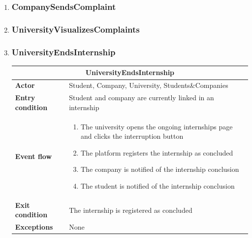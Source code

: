\begin{enumerate}[label=\textbf{UC\arabic* -}]
\item \subsubsection{CompanySendsComplaint}

\item \subsubsection{UniversityVisualizesComplaints}

\item \subsubsection{UniversityEndsInternship}

\begin{table}[H]
    \centering
    \begin{tabular}{|l|m{10cm}|}
        \hline \multicolumn{2}{|c|}{\textbf{UniversityEndsInternship}} \\
        \hline \textbf{Actor} & Student, Company, University, Students\&Companies \\
        \hline \textbf{Entry condition} & Student and company are currently linked in an internship \\
        \hline \textbf{Event flow} &
            \begin{enumerate}[label=\arabic*]
                \item The university opens the ongoing internships page and clicks the interruption button
                \item The platform registers the internship as concluded
                \item The company is notified of the internship conclusion
                \item The student is notified of the internship conclusion
            \end{enumerate} \\
        \hline \textbf{Exit condition} & The internship is registered as concluded \\
        \hline \textbf{Exceptions} & None \\
        \hline
    \end{tabular}
\end{table}


\end{enumerate}
